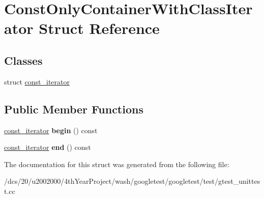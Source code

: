 \hypertarget{structConstOnlyContainerWithClassIterator}{}\section{Const\+Only\+Container\+With\+Class\+Iterator Struct Reference}
\label{structConstOnlyContainerWithClassIterator}
\subsection*{Classes}
\begin{DoxyCompactItemize}
\item 
struct \mbox{\hyperlink{structConstOnlyContainerWithClassIterator_1_1const__iterator}{const\+\_\+iterator}}
\end{DoxyCompactItemize}
\subsection*{Public Member Functions}
\begin{DoxyCompactItemize}
\item 
\mbox{\label{structConstOnlyContainerWithClassIterator_a30be5262acd17c34d19b19d560ebd541}} 
\mbox{\hyperlink{structConstOnlyContainerWithClassIterator_1_1const__iterator}{const\+\_\+iterator}} {\bfseries begin} () const
\item 
\mbox{\label{structConstOnlyContainerWithClassIterator_a3d6e17f17eecd7b1ef02afc9a75a0bde}} 
\mbox{\hyperlink{structConstOnlyContainerWithClassIterator_1_1const__iterator}{const\+\_\+iterator}} {\bfseries end} () const
\end{DoxyCompactItemize}


The documentation for this struct was generated from the following file\+:\begin{DoxyCompactItemize}
\item 
/dcs/20/u2002000/4th\+Year\+Project/wash/googletest/googletest/test/gtest\+\_\+unittest.\+cc\end{DoxyCompactItemize}
